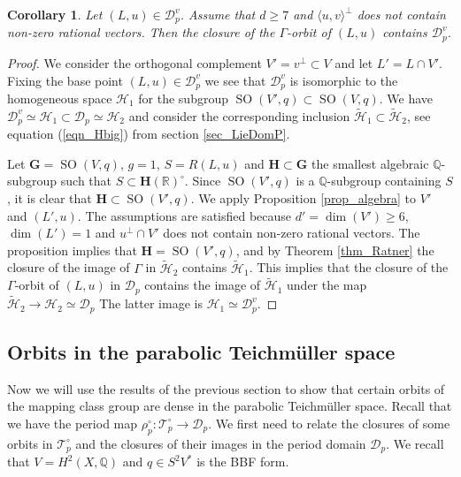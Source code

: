 \documentclass[11pt]{article}
\newcommand{\6}{\partial}
\newcommand{\bbQ}{\mathbb{Q}}
\newcommand{\bbR}{\mathbb{R}}
\newcommand{\HH}{\mathcal{H}}
\newcommand{\SO}{\operatorname{SO}}
\renewcommand{\ge}{\geqslant}
\newcommand{\Teich}{\mathcal{T}}
\newcommand{\TeichP}{\Teich_p}
\newcommand{\Dom}{\mathcal{D}}
\newcommand{\DomP}{\Dom_p}
\newcommand{\Per}{\rho}
\newcommand{\PerP}{\Per_p}
\newtheorem{cor}[defn]{Corollary}
\begin{document}
\begin{cor}\label{cor_period2}
Let $(L,u)\in \DomP^v$. Assume that $d\ge 7$ and $\langle u,v\rangle^\perp$ does not contain non-zero rational vectors.
Then the closure of the $\Gamma$-orbit of $(L,u)$ contains $\DomP^v$.
\end{cor}
\begin{proof}
We consider the orthogonal complement $V'=v^\perp \subset V$ and let $L'=L\cap V'$.
Fixing the base point $(L,u)\in \DomP^v$ we see that $\DomP^v$ is isomorphic to the
homogeneous space $\HH_1$ for the subgroup $\SO(V',q)\subset \SO(V,q)$.
We have $\DomP^v\simeq \HH_1 \subset \DomP\simeq \HH_2$ and consider
the corresponding inclusion $\widetilde{\HH}_1\subset \widetilde{\HH}_2$,
see equation (\ref{eqn_Hbig}) from section \ref{sec_LieDomP}.

Let $\mathbf{G} = \SO(V,q)$, $g=1$, $S = R(L,u)$ and $\mathbf{H}\subset \mathbf{G}$
the smallest algebraic $\bbQ$-subgroup such that $S\subset \mathbf{H}(\bbR)^\circ$.
Since $\SO(V',q)$ is a $\bbQ$-subgroup containing $S$, it is clear that $\mathbf{H}\subset \SO(V',q)$.
We apply Proposition \ref{prop_algebra} to $V'$ and $(L',u)$. The assumptions
are satisfied because $d' = \dim(V')\ge 6$, $\dim(L')=1$ and $u^\perp\cap V'$
does not contain non-zero rational vectors. The proposition implies
that $\mathbf{H} = \SO(V',q)$, and by Theorem \ref{thm_Ratner} the closure of the
image of $\Gamma$ in $\widetilde{\HH}_2$ contains $\widetilde{\HH}_1$.
This implies that the closure of the $\Gamma$-orbit of $(L,u)$ in $\DomP$
contains the image of $\widetilde{\HH}_1$ under the map $\widetilde{\HH}_2\to \HH_2\simeq \DomP$
The latter image is $\HH_1\simeq \DomP^v$.
\end{proof}

\subsection{Orbits in the parabolic Teichm\"uller space}
\label{_orbits_parabolic_Subsection_}

Now we will use the results of the previous section to show that certain orbits
of the mapping class group are dense in the parabolic Teichm\"uller space.
Recall that we have the period map $\PerP^\circ\colon \TeichP^\circ\to\DomP$.
We first need to relate the closures of some orbits in $\TeichP^\circ$
and the closures of their images in the period domain $\DomP$.
We recall that $V = H^2(X,\bbQ)$ and $q\in S^2V^*$ is the BBF form.
\end{document}
